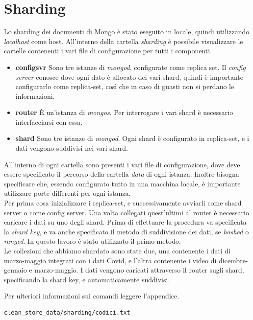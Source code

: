 \documentclass[10pt, a4paper,openany]{article}
\begin{document}
\section*{Sharding}

Lo sharding dei documenti di Mongo è stato eseguito in locale, quindi utilizzando \textit{localhost} come host. All'interno della cartella \textit{sharding} è possibile visualizzare le cartelle contenenti i vari file di configurazione per tutti i componenti.

\begin{itemize}
	\item \textbf{configsvr} Sono tre istanze di \textit{mongod}, configurate come replica set. Il \textit{config server} conosce dove ogni dato è allocato dei vari shard, quindi è importante configurarlo come replica-set, così che in caso di guasti non si perdano le informazioni.
	\item \textbf{router} \`E un'istanza di \textit{mongos}. Per interrogare i vari shard è necessario interfacciarsi con essa.
	\item \textbf{shard} Sono tre istanze di \textit{mongod}. Ogni shard è configurato in replica-set, e i dati vengono suddivisi nei vari shard.
\end{itemize}

All'interno di ogni cartella sono presenti i vari file di configurazione, dove deve essere specificato il percorso della cartella \textit{data} di ogni istanza. Inoltre bisogna specificare che, essendo configurato tutto in una macchina locale, è importante utilizzare porte differenti per ogni istanza.
\\
Per prima cosa inizializzare i replica-set, e successivamente avviarli come shard server o come config server. Una volta collegati quest'ultimi al router è necessario caricare i dati su uno degli shard. Prima di effettuare la procedura va specificata la \textit{shard key}, e va anche specificato il metodo di suddivisione dei dati, se \textit{hashed} o \textit{ranged}. In questo lavoro è stato utilizzato il primo metodo.
\\
Le collezioni che abbiamo shardato sono state due, una contenente i dati di marzo-maggio integrati con i dati Covid, e l'altra contenente i video di dicembre-gennaio e marzo-maggio. I dati vengono caricati attraverso il router sugli shard, specificando la shard key, e automaticamente suddivisi.

Per ulteriori informazioni sui comandi leggere l'appendice.

\begin{verbatim}
clean_store_data/sharding/codici.txt
\end{verbatim}
\end{document}
